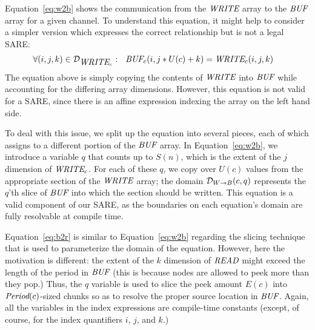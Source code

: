 Equation~\ref{eq:w2b} shows the communication from the $\mbox{\it WRITE}$
array to the $\mbox{\it BUF}$ array for a given channel.  To understand this
equation, it might help to consider a simpler version which expresses
the correct relationship but is not a legal SARE:
\begin{align*}
&\forall (i,j,k) \in {\cal D}_{\mbox{\it WRITE}_c}:~~
\mbox{\it BUF}_{c}(i,j*U(c)+k) = \mbox{\it WRITE}_{c}(i, j, k)
\end{align*}
The equation above is simply copying the contents of $\mbox{\it WRITE}$ into
$\mbox{\it BUF}$ while accounting for the differing array dimensions.
However, this equation is not valid for a SARE, since there is an
affine expression indexing the array on the left hand side.

To deal with this issue, we split up the equation into several pieces,
each of which assigns to a different portion of the $\mbox{\it BUF}$ array.
In Equation~\ref{eq:w2b}, we introduce a variable $q$ that counts up
to $S(n)$, which is the extent of the $j$ dimension of $\mbox{\it WRITE}_c$.
For each of these $q$, we copy over $U(c)$ values from the appropriate
section of the $\mbox{\it WRITE}$ array; the domain ${\cal D}_{W \rightarrow
B}(c,q)$ represents the $q$'th slice of $\mbox{\it BUF}$ into which the
section should be written.  This equation is a valid component of our
SARE, as the boundaries on each equation's domain are fully resolvable
at compile time.

\clearpage
Equation~\ref{eq:b2r} is similar to Equation~\ref{eq:w2b} regarding
the slicing technique that is used to parameterize the domain of the
equation.  However, here the motivation is different: the extent of
the $k$ dimension of $\mbox{\it READ}$ might exceed the length of the period
in $\mbox{\it BUF}$ (this is because nodes are allowed to peek more than
they pop.)  Thus, the $q$ variable is used to slice the peek amount
$E(c)$ into $\mbox{\it Period}(c)$-sized chunks so as to resolve the proper
source location in $\mbox{\it BUF}$.  Again, all the variables in the index
expressions are compile-time constants (except, of course, for the
index quantifiers $i$, $j$, and $k$.)





